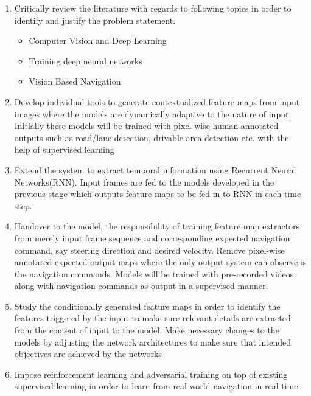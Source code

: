 
\begin{enumerate}
\item Critically review the literature with regards to following topics in order to identify and justify the problem statement.
	\begin{itemize}
		\item Computer Vision and Deep Learning
		\item Training deep neural networks
		\item Vision Based Navigation
	\end{itemize}
	
\item Develop individual tools to generate contextualized feature maps from input images where the models are dynamically adaptive to the nature of input. Initially these models will be trained with pixel wise human annotated outputs such as road/lane detection, drivable area detection etc. with the help of supervised learning

\item  Extend the system to extract temporal information using Recurrent Neural Networks(RNN). Input frames are fed to the models developed in the previous stage which outputs feature maps to be fed in to RNN in each time step.

\item Handover to the model, the responsibility of training feature map extractors from merely input frame sequence and corresponding expected navigation command, say steering direction and desired velocity. Remove pixel-wise annotated expected output maps where the only output system can observe is the navigation commands. Models will be trained with pre-recorded videos along with navigation commands as output in a supervised manner.

\item Study the conditionally generated feature maps in order to identify the features triggered by the input to make sure relevant details are extracted from the content of input to the model. Make necessary changes to the models by adjusting the network architectures to make sure that intended objectives are achieved by the networks 

\item Impose reinforcement learning and adversarial training on top of existing supervised learning in order to learn from real world navigation in real time.



\end{enumerate}